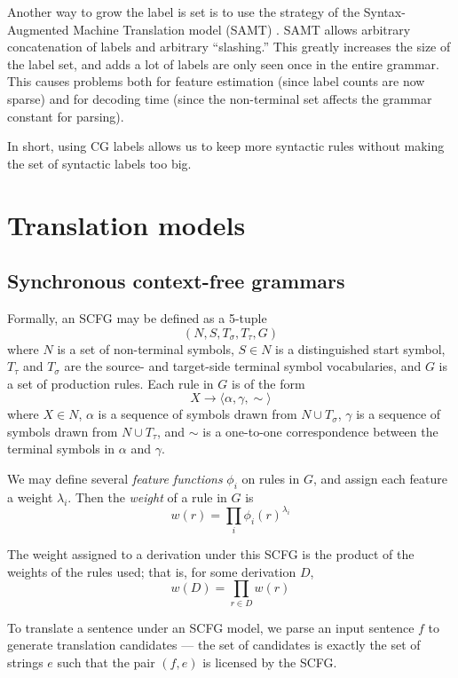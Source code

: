 \documentclass{article}
\begin{document}
Another way to grow the label is set is to use the strategy of the Syntax-Augmented Machine Translation model (SAMT) \cite{samt-wmt06}. SAMT allows arbitrary concatenation of labels and arbitrary ``slashing.'' This greatly increases the size of the label set, and adds a lot of labels are only seen once in the entire grammar. This causes problems both for feature estimation (since label counts are now sparse) and for decoding time (since the non-terminal set affects the grammar constant for parsing).

In short, using CG labels allows us to keep more syntactic rules without making the set of syntactic labels too big.

\section{Translation models}

\subsection{Synchronous context-free grammars}

Formally, an SCFG may be defined as a 5-tuple
$$(N,S,T_\sigma,T_\tau,G)$$
where $N$ is a set of non-terminal symbols, $S \in N$ is a distinguished start symbol, $T_\tau$ and $T_\sigma$ are the source- and target-side terminal symbol vocabularies, and $G$ is a set of production rules. Each rule in $G$ is of the form
$$X \to \langle \alpha, \gamma, \sim \rangle$$
where $X \in N$, $\alpha$ is a sequence of symbols drawn from $N \cup T_\sigma$, $\gamma$ is a sequence of symbols drawn from $N \cup T_\tau$, and $\sim$ is a one-to-one correspondence between the terminal symbols in $\alpha$ and $\gamma$.

We may define several {\em feature functions} $\phi_i$ on rules in $G$, and assign each feature a weight $\lambda_i$. Then the {\em weight} of a rule in $G$ is
\begin{equation}
w(r) = \prod_i{\phi_i(r)^{\lambda_i}}
\end{equation}

The weight assigned to a derivation under this SCFG is the product of the weights of the rules used; that is, for some derivation $D$,
\begin{equation}
w(D) = \prod_{r \in D}{w(r)}
\end{equation}

To translate a sentence under an SCFG model, we parse an input sentence $f$ to generate translation candidates --- the set of candidates is exactly the set of strings $e$ such that the pair $(f,e)$ is licensed by the SCFG.
\end{document}
